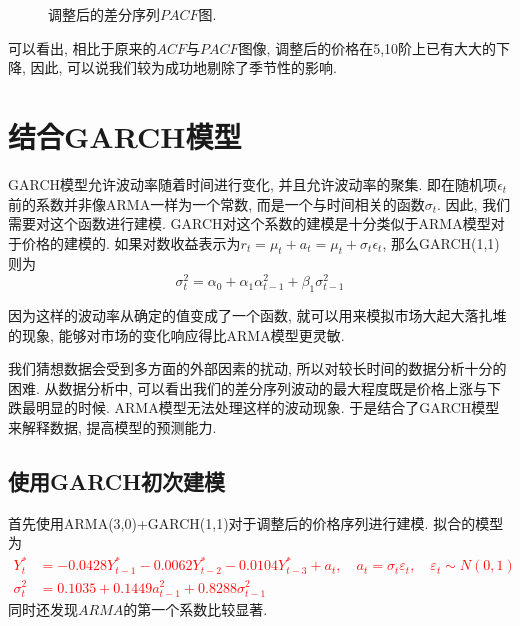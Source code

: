 \documentclass[11pt]{article}
\begin{document}
\begin{center}
\begin{minipage}{0.45\textwidth}
\begin{figure}
            \caption{调整后的差分序列$PACF$图.\label{fig:12}}
        \end{figure}
    \end{minipage}
\end{center}

\qquad 可以看出, 相比于原来的$ACF$与$PACF$图像, 调整后的价格在5,10阶上已有大大的下降, 因此, 可以说我们较为成功地剔除了季节性的影响. 
\section{结合GARCH模型}
\qquad GARCH模型允许波动率随着时间进行变化, 并且允许波动率的聚集. 即在随机项$\epsilon_t$前的系数并非像ARMA一样为一个常数, 而是一个与时间相关的函数$\sigma_t$. 因此, 我们需要对这个函数进行建模. GARCH对这个系数的建模是十分类似于ARMA模型对于价格的建模的. 如果对数收益表示为$r_t=\mu_t+a_t=\mu_t+\sigma_t\epsilon_t$, 那么GARCH(1,1)则为
\begin{equation*}
\sigma_t^2=\alpha_0+\alpha_1\alpha_{t-1}^2+\beta_1\sigma^2_{t-1}
\end{equation*}

\qquad 因为这样的波动率从确定的值变成了一个函数, 就可以用来模拟市场大起大落扎堆的现象, 能够对市场的变化响应得比ARMA模型更灵敏.

\qquad 我们猜想数据会受到多方面的外部因素的扰动, 所以对较长时间的数据分析十分的困难. 从数据分析中, 可以看出我们的差分序列波动的最大程度既是价格上涨与下跌最明显的时候. ARMA模型无法处理这样的波动现象. 于是结合了GARCH模型来解释数据, 提高模型的预测能力. 

\subsection{使用GARCH初次建模}
\qquad 首先使用ARMA(3,0)+GARCH(1,1)对于调整后的价格序列进行建模. 拟合的模型为
\textcolor{red}{
\begin{equation*}\begin{aligned}
    Y_{t}^{*} &=-0.0428 Y_{t-1}^{*}-0.0062 Y_{t-2}^{*}-0.0104 Y_{t-3}^{*}+a_{t}, \quad a_{t}=\sigma_{t} \varepsilon_{t}, \quad \varepsilon_{t} \sim N(0,1) \\
    \sigma_{t}^{2} &=0.1035+ 0.1449 a_{t-1}^{2}+0.8288 \sigma_{t-1}^{2}
\end{aligned}\end{equation*}}
同时还发现$ARMA$的第一个系数比较显著. 
\end{document}
